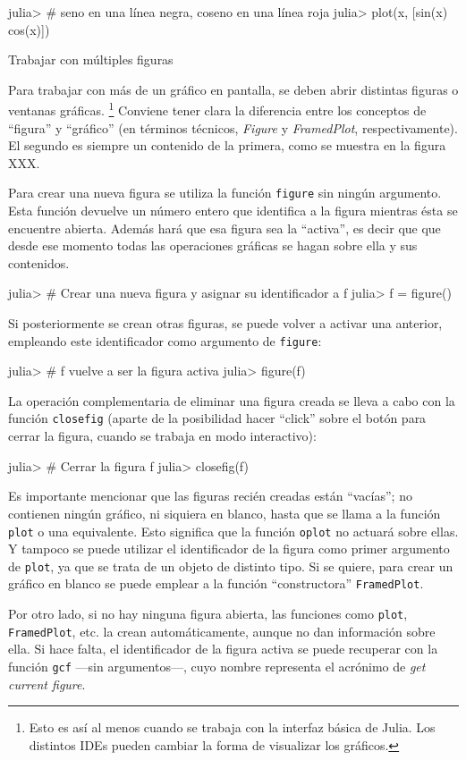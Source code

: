 ﻿\documentclass{article}
\newcommand{\code}{\texttt}
\begin{document}
julia> # seno en una línea negra, coseno en una línea roja
julia> plot(x, [sin(x) cos(x)])


Trabajar con múltiples figuras

Para trabajar con más de un gráfico en pantalla, se deben abrir distintas figuras o ventanas gráficas.%
\footnote{%
Esto es así al menos cuando se trabaja con la interfaz básica de Julia. Los distintos IDEs pueden cambiar la forma de visualizar los gráficos.%
}
Conviene tener clara la diferencia entre los conceptos de ``figura'' y ``gráfico'' (en términos técnicos, \emph{Figure} y \emph{FramedPlot}, respectivamente). El segundo es siempre un contenido de la primera, como se muestra en la figura XXX.

Para crear una nueva figura se utiliza la función \code{figure} sin ningún argumento. Esta función devuelve un número entero que identifica a la figura mientras ésta se encuentre abierta. Además hará que esa figura sea la ``activa'', es decir que que desde ese momento todas las operaciones gráficas se hagan sobre ella y sus contenidos.

julia> # Crear una nueva figura y asignar su identificador a f
julia> f = figure()

Si posteriormente se crean otras figuras, se puede volver a activar una anterior, empleando este identificador como argumento de \code{figure}:

julia> # f vuelve a ser la figura activa
julia> figure(f)

La operación complementaria de eliminar una figura creada se lleva a cabo con la función \code{closefig} (aparte de la posibilidad hacer ``click'' sobre el botón para cerrar la figura, cuando se trabaja en modo interactivo):

julia> # Cerrar la figura f
julia> closefig(f)

Es importante mencionar que las figuras recién creadas están ``vacías''; no contienen ningún gráfico, ni siquiera en blanco, hasta que se llama a la función \code{plot} o una equivalente. Esto significa que la función \code{oplot} no actuará sobre ellas. Y tampoco se puede utilizar el identificador de la figura como primer argumento de \code{plot}, ya que se trata de un objeto de distinto tipo. Si se quiere, para crear un gráfico en blanco se puede emplear a la función ``constructora'' \code{FramedPlot}.

Por otro lado, si no hay ninguna figura abierta, las funciones como \code{plot}, \code{FramedPlot}, etc. la crean automáticamente, aunque no dan información sobre ella. Si hace falta, el identificador de la figura activa se puede recuperar con la función \code{gcf} ---sin argumentos---, cuyo nombre representa el acrónimo de \emph{get current figure}.
\end{document}
